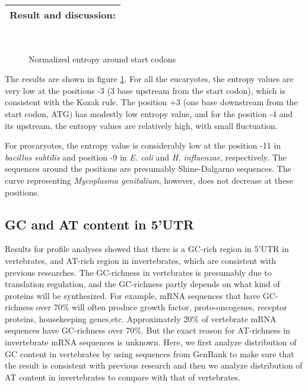\vspace{2ex}
\noindent
\begin{tabular}{|l|}
\hline
 Result and discussion:\\
\hline
\end{tabular}

\begin{figure}
\\
\caption{Normalized entropy around start codons}
\label{entro}
\end{figure}

The results are shown in figure \ref{entro}.
For all the eucaryotes, the entropy values are very low at the
positions -3 (3 base upstream from the start codon), which is
consistent with the Kozak rule\cite{label3}.  The position +3 (one
base downstream from the start codon, ATG) has modestly low entropy
value, and for the position -4 and its upstream, the entropy values
are relatively high, with small fluctuation.

For procaryotes, the
entropy value is considerably low at the position -11 in {\it bacillus
subtilis} and position -9 in {\it E. coli} and {\it H. influenzae},
respectively.  The sequences around the positions are presumably
Shine-Dalgarno sequences.  The curve representing {\it Mycoplasma
genitalium}, however, does not decrease at these positions.

\subsection{GC and AT content in 5'UTR}

Results for profile analyses showed that there is a GC-rich region in
5'UTR in vertebrates, and AT-rich region in invertebrates, which are
consistent with previous researches. The GC-richness in vertebrates
is presumably due to translation regulation, and the GC-richness
partly depends on what kind of proteins will be synthesized. For
example, mRNA sequences that have GC-richness over 70\% will often
produce growth factor, proto-oncogenes, receptor proteins,
housekeeping genes,etc\cite{label12}. Approximately 20\% of vertebrate
mRNA sequences have GC-richness over 70\%. But the exact reason for
AT-richness in invertebrate mRNA sequences is unknown.
Here, we first analyze distribution of GC content in vertebrates by
using sequences from GenBank to make sure that the result is
consistent with previous research and then we analyze distribution of
AT content in invertebrates to compare with that of vertebrates.

